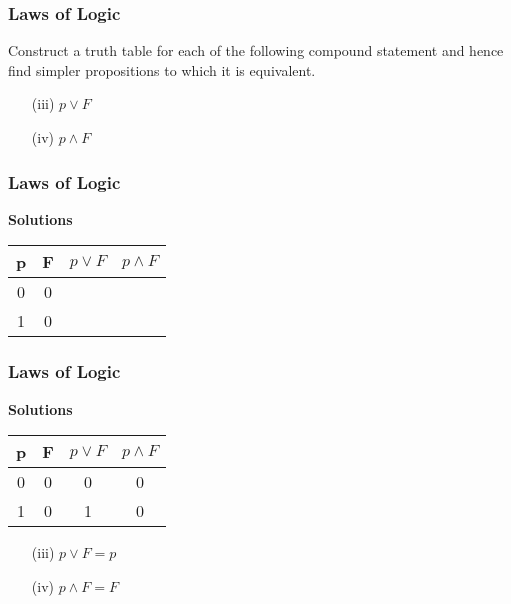 \documentclass{beamer}
\begin{document}
\begin{frame}

\frametitle{Laws of Logic}
\Large
\vspace{-1cm}
Construct a truth table for each of the following compound statement and hence find simpler propositions to which it is equivalent.


\begin{itemize}
\item[(iii)] $p \vee F$
\item[(iv)] $p \wedge F$
\end{itemize}
\end{frame}
\begin{frame}
\frametitle{Laws of Logic}
\Large
\vspace{-1cm}
\textbf{Solutions}
\begin{center}

\begin{tabular}{|c|c||c|c|}
\hline  \phantom{sp}p\phantom{sp}&  \phantom{sp}F\phantom{sp}& $p \vee F$ & $ p \wedge F$ \\ \hline
\hline  0 & 0 &  &  \\ 
\hline  1 &  0 &  &  \\ 
\hline 
\end{tabular} 

\end{center}
\end{frame}
\begin{frame}
\frametitle{Laws of Logic}
\Large
\vspace{-1cm}
\textbf{Solutions}
\begin{center}
\begin{tabular}{|c|c||c|c|}
\hline  \phantom{sp}p\phantom{sp}&  \phantom{sp}F\phantom{sp}& $p \vee F$ & $ p \wedge F$ \\ \hline
\hline  0 & 0 & 0 & 0 \\ 
\hline  1 &  0 & 1 & 0 \\ 
\hline 
\end{tabular} 

\end{center}
\begin{itemize}
\item[(iii)] $p \vee F = p $
\item[(iv)] $p \wedge F = F $
\end{itemize}
\end{frame}
\end{document}
